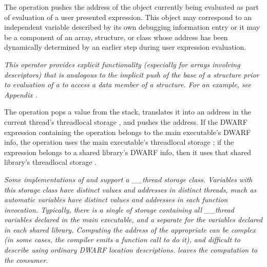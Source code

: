 \begin{enumerate}[1. ]
The 
operation pushes the address
of the object currently being evaluated as part of evaluation
of a user presented expression. This object may correspond
to an independent variable described by its own debugging
information entry or it may be a component of an array,
structure, or class whose address has been dynamically
determined by an earlier step during user expression
evaluation.

\textit{This operator provides explicit functionality
(especially for arrays involving descriptors) that is analogous
to the implicit push of the base 
of a structure prior
to evaluation of a  to access a
data member of a structure. For an example, see 
Appendix .}

The  operation pops a value from the
stack, translates it into an address in the current thread's
thread\dash local storage , and pushes the address. If the
DWARF expression containing 
the 
operation belongs to the main executable's DWARF info, the
operation uses the main executable's thread\dash local storage
; if the expression belongs to a shared library's
DWARF info, then it uses that shared library's 
thread\dash local storage .

\textit{Some implementations of 
 and  support a
\_\_thread storage class. Variables with this storage class
have distinct values and addresses in distinct threads, much
as automatic variables have distinct values and addresses in
each function invocation. Typically, there is a single 
of storage containing all \_\_thread variables declared in
the main executable, and a separate  for the variables
declared in each shared library. Computing the address of
the appropriate  can be complex (in some cases, the
compiler emits a function call to do it), and difficult
to describe using ordinary DWARF location descriptions.
 leaves the computation to the
consumer.}


\end{enumerate}
